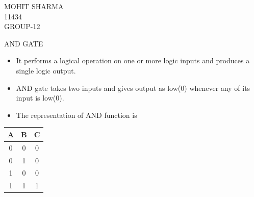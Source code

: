 \documentclass{beamer}
\begin{document}
\begin{frame}
MOHIT SHARMA \\
11434\\
GROUP-12
\end{frame}
\begin{frame}[label=AND]{AND GATE}
\begin{block}{}
    \begin{itemize}
	\item It performs a logical operation on one or more logic inputs and produces a single logic output.
	\item AND gate takes two inputs and gives output as low(0) whenever any of its input is low(0).   
	\item The representation of \alert{AND} function is  
    \end{itemize}
  \end{block}
\pause
\begin{block}{}
\begin{tabular}{|c|c||c|}
\hline
 \textbf{A} &
\textbf{B} & \textbf{C} \\
\hline
\hline
 0 & 0 & 0 \\
\hline
 0 & 1 & 0 \\
\hline
 1 & 0 & 0 \\
\hline
 1 & 1 & 1 \\
\hline
\end{tabular}
\end{block}
\end{frame}
\end{document}
